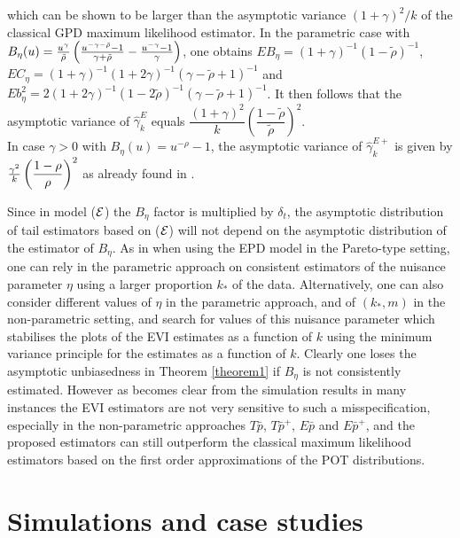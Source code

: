 which can be shown to be larger than the asymptotic variance $(1+\gamma)^2/k$ of the classical GPD maximum likelihood estimator. In the parametric case with $B_\eta (u) = {u^{\gamma} \over \tilde\rho}\left({u^{-\gamma -\tilde{\rho}}-1 \over \gamma +\tilde\rho}- {u^{-\gamma}-1 \over \gamma}\right)$, one obtains $EB_\eta = (1+\gamma)^{-1}(1-\tilde\rho)^{-1}$, $EC_\eta = (1+\gamma)^{-1}(1+2\gamma)^{-1}
(\gamma-\tilde\rho+1)^{-1}$ and $Eb^2_\eta = 2 (1+2\gamma)^{-1}(1-2\tilde\rho)^{-1}(\gamma-\tilde\rho+1)^{-1}$. It then follows that the asymptotic variance of $\hat{\gamma}_k^{E}$ equals $\dfrac{(1+\gamma)^2}{k} \left(\dfrac{1-\tilde\rho}{\tilde\rho}\right)^2$.\\
In case $\gamma >0$ with $B_\eta (u)= u^{-\rho}-1$, the asymptotic variance of $\hat{\gamma}_k^{E+}$ is given by ${\gamma^2 \over k} \left(\dfrac{1-\rho}{\rho}\right)^2$ as already found in \cite{beirlant2009second}.

\vspace{0.3cm}
Since in model (${\cal{E}}$) the $B_{\eta}$ factor is multiplied by $\delta_t$, the asymptotic distribution of tail estimators based on (${\cal{E}}$) will not depend on the asymptotic distribution of the estimator of $B_{\eta}$. As in \cite{beirlant2009second} when using the EPD model in the Pareto-type setting, one can rely in the parametric approach on consistent estimators of the nuisance parameter $\eta$ using a larger proportion $k_*$ of the data.
 Alternatively, one can also consider different values of $\eta$ in the parametric approach, and of $(k_*,m)$ in the non-parametric setting, and search for values of this nuisance parameter which stabilises the plots of the EVI estimates as a function of $k$ using the minimum variance principle for the estimates as a function of $k$. Clearly one loses the asymptotic unbiasedness in Theorem \ref{theorem1} if $B_{\eta}$ is not consistently estimated. However as becomes clear from the simulation results in many instances the EVI estimators are not very sensitive to such a misspecification, especially in the non-parametric approaches $T\bar{p}$, $T\bar{p}^+$, $E\bar{p}$
and $E\bar{p}^+$, and the proposed estimators can still outperform the classical maximum likelihood estimators based on the first order approximations of the POT distributions.  


\section{Simulations and case studies}
 

